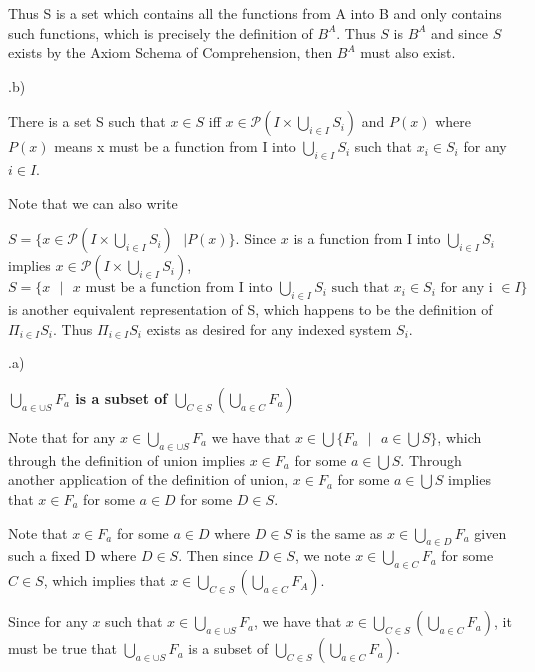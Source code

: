 \documentclass{article}
\begin{document}
\medskip

Thus S is a set which contains all the functions from A into B and only contains such functions, which is precisely the definition of $B^{A}$. Thus $S$ is $B^{A}$ and since $S$ exists by the Axiom Schema of Comprehension, then $B^{A}$ must also exist.

.b)

There is a set S such that $x \in S$ iff $x \in \mathcal{P}(I \times \bigcup_{i \in I} S_i)$ and $P(x)$ where $P(x)$ means x must be a function from I into $\bigcup_{i \in I} S_i$ such that $x_i \in S_i$ for any $i \in I$.

\medskip

Note that we can also write 

$S = \{x \in \mathcal{P}(I \times \bigcup_{i \in I} S_i) \text{ } | P(x) \}$. Since $x$ is a function from I into $\bigcup_{i \in I} S_i$ implies $x \in \mathcal{P}(I \times \bigcup_{i \in I} S_i)$, $S = \{x \text{ } | \text{ } x \text{ must be a function from I into }  \bigcup_{i \in I} S_i \text{ such that } x_i \in S_i \text{ for any i } \in I\}$ is another equivalent representation of S, which happens to be the definition of $\Pi_{i \in I}S_i$. Thus $\Pi_{i \in I}S_i$ exists as desired for any indexed system $S_i$.

.a)

\medskip
\textbf{$\bigcup_{a \in \cup S} F_a$ is a subset of $\bigcup_{C \in S}(\bigcup_{a \in C}F_a)$}
\medskip

Note that for any $x \in \bigcup_{a \in \cup S} F_a$ we have that $x \in \bigcup\{F_a \text{ } | \text{ } a \in \bigcup S\}$, which through the definition of union implies $x \in F_a$ for some $a \in \bigcup S$. Through another application of the definition of union, $x \in F_a$ for some $a \in \bigcup S$ implies that $x \in F_a$ for some $a \in D$ for some $D \in S$.

\medskip

Note that $x \in F_a$ for some $a \in D$ where $D \in S$ is the same as $x \in \bigcup_{a \in D} F_a$ given such a fixed D where $D \in S$. Then since $D \in S$, we note $x \in \bigcup_{a \in C} F_a$ for some $C \in S$, which implies that $x \in \bigcup_{C \in S} (\bigcup_{a \in C} F_A)$.

\medskip

Since for any $x$ such that $x \in \bigcup_{a \in \cup S} F_a$, we have that $x \in \bigcup_{C \in S}(\bigcup_{a \in C}F_a)$, it must be true that $\bigcup_{a \in \cup S} F_a$ is a subset of $\bigcup_{C \in S}(\bigcup_{a \in C}F_a)$. 
\end{document}
